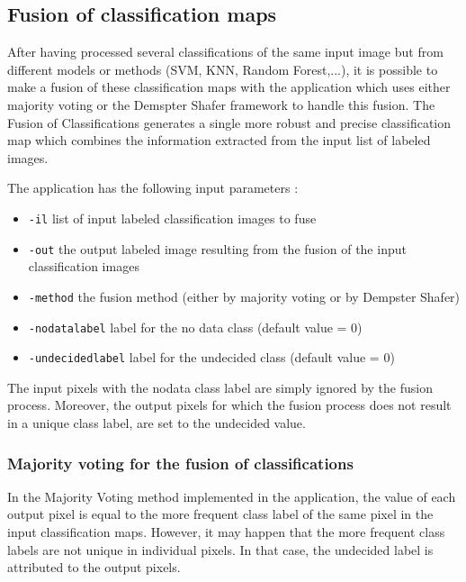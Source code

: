 \subsection{Fusion of classification maps}\label{ssec:fusionofclassifications}

After having processed several classifications of the same input image but from 
different models or methods (SVM, KNN, Random Forest,...), it is possible to make a 
fusion of these classification maps with the  
application which uses either majority voting or the Demspter Shafer framework to 
handle this fusion. The Fusion of Classifications generates a single more robust and 
precise classification map which combines the information extracted from the input 
list of labeled images. 

The  application has the following input parameters :
\begin{itemize}
\item \verb?-il? list of input labeled classification images to fuse
\item \verb?-out? the output labeled image resulting from the fusion of the input classification images
\item \verb?-method? the fusion method (either by majority voting or by Dempster Shafer)
\item \verb?-nodatalabel? label for the no data class (default value = 0)
\item \verb?-undecidedlabel? label for the undecided class (default value = 0)
\end{itemize}


The input pixels with the nodata class label are simply ignored by the fusion process. 
Moreover, the output pixels for which the fusion process does not result in a unique 
class label, are set to the undecided value.

\subsubsection{Majority voting for the fusion of classifications}

In the Majority Voting method implemented in the  
application, the value of each output pixel is equal to the more frequent class 
label of the same pixel in the input classification maps. However, it may happen 
that the more frequent class labels are not unique in individual pixels. In that 
case, the undecided label is attributed to the output pixels.


